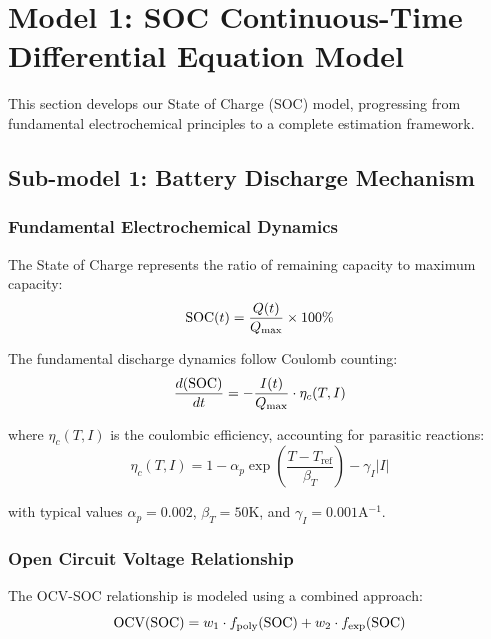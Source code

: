 \section{Model 1: SOC Continuous-Time Differential Equation Model}

This section develops our State of Charge (SOC) model, progressing from fundamental electrochemical principles to a complete estimation framework.

\subsection{Sub-model 1: Battery Discharge Mechanism}

\subsubsection{Fundamental Electrochemical Dynamics}

The State of Charge represents the ratio of remaining capacity to maximum capacity:
\begin{equation}
\text{SOC}(t) = \frac{Q(t)}{Q_{\max}} \times 100\%
\label{eq:soc_def}
\end{equation}

The fundamental discharge dynamics follow Coulomb counting:
\begin{equation}
\frac{d(\text{SOC})}{dt} = -\frac{I(t)}{Q_{\max}} \cdot \eta_c(T, I)
\label{eq:coulomb}
\end{equation}

where $\eta_c(T, I)$ is the coulombic efficiency, accounting for parasitic reactions:
\begin{equation}
\eta_c(T, I) = 1 - \alpha_p \exp\left(\frac{T - T_{\text{ref}}}{\beta_T}\right) - \gamma_I |I|
\label{eq:efficiency}
\end{equation}

with typical values $\alpha_p = 0.002$, $\beta_T = 50$K, and $\gamma_I = 0.001$A$^{-1}$.

\subsubsection{Open Circuit Voltage Relationship}

The OCV-SOC relationship is modeled using a combined approach:
\begin{equation}
\text{OCV}(\text{SOC}) = w_1 \cdot f_{\text{poly}}(\text{SOC}) + w_2 \cdot f_{\text{exp}}(\text{SOC})
\label{eq:ocv_soc}
\end{equation}

